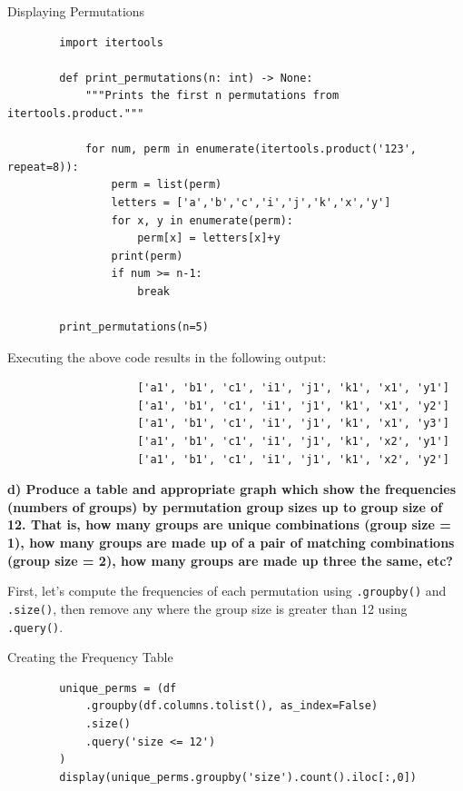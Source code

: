 \documentclass{article}
\begin{document}
\begin{mybox}[colbacktitle=green]{Displaying Permutations}
    \begin{verbatim}
        import itertools

        def print_permutations(n: int) -> None:
            """Prints the first n permutations from itertools.product."""

            for num, perm in enumerate(itertools.product('123', repeat=8)):
                perm = list(perm)
                letters = ['a','b','c','i','j','k','x','y']
                for x, y in enumerate(perm):
                    perm[x] = letters[x]+y
                print(perm)
                if num >= n-1:
                    break

        print_permutations(n=5)
    \end{verbatim}
\end{mybox}

Executing the above code results in the following output:
\begin{verbatim}
                    ['a1', 'b1', 'c1', 'i1', 'j1', 'k1', 'x1', 'y1']
                    ['a1', 'b1', 'c1', 'i1', 'j1', 'k1', 'x1', 'y2']
                    ['a1', 'b1', 'c1', 'i1', 'j1', 'k1', 'x1', 'y3']
                    ['a1', 'b1', 'c1', 'i1', 'j1', 'k1', 'x2', 'y1']
                    ['a1', 'b1', 'c1', 'i1', 'j1', 'k1', 'x2', 'y2']
\end{verbatim}

\vspace{\baselineskip}

\textbf{d) Produce a table and appropriate graph which show the frequencies (numbers of groups) by permutation group sizes up to group size of 12. That is, how many groups are unique combinations (group size = 1), how many groups are made up of a pair of matching combinations (group size = 2), how many groups are made up three the same, etc? }

\vspace{\baselineskip}

First, let's compute the frequencies of each permutation using \texttt{.groupby()} and \texttt{.size()}, then remove any where the group size is greater than 12 using \texttt{.query()}. 

\begin{mybox}[colbacktitle=green]{Creating the Frequency Table}
    \begin{verbatim}
        unique_perms = (df
            .groupby(df.columns.tolist(), as_index=False)
            .size()
            .query('size <= 12')
        )
        display(unique_perms.groupby('size').count().iloc[:,0])
    \end{verbatim}
\end{mybox}
\end{document}
